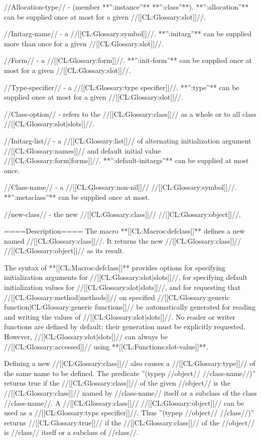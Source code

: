 //Allocation-type// - (member **'':instance''** **'':class''**). **'':allocation''** can be supplied once at most for a given //[[CL:Glossary:slot]]//.

//Initarg-name// - a //[[CL:Glossary:symbol]]//. **'':initarg''** can be supplied more than once for a given //[[CL:Glossary:slot]]//.

//Form// - a //[[CL:Glossary:form]]//. **'':init-form''** can be supplied once at most for a given //[[CL:Glossary:slot]]//.

//Type-specifier// - a //[[CL:Glossary:type specifier]]//. **'':type''** can be supplied once at most for a given //[[CL:Glossary:slot]]//.

//Class-option// - refers to the //[[CL:Glossary:class]]// as a whole or to all class //[[CL:Glossary:slot|slots]]//.

//Initarg-list// - a //[[CL:Glossary:list]]// of alternating initialization argument //[[CL:Glossary:names]]// and default initial value //[[CL:Glossary:form|forms]]//. **'':default-initargs''** can be supplied at most once.

//Class-name// - a //[[CL:Glossary:non-nil]]// //[[CL:Glossary:symbol]]//. **'':metaclass''** can be supplied once at most.

//new-class// - the new //[[CL:Glossary:class]]// //[[CL:Glossary:object]]//.

====Description====
The macro **[[CL:Macros:defclass]]** defines a new named //[[CL:Glossary:class]]//. It returns the new //[[CL:Glossary:class]]// //[[CL:Glossary:object]]// as its result.

The syntax of **[[CL:Macros:defclass]]** provides options for specifying initialization arguments for //[[CL:Glossary:slot|slots]]//, for specifying default initialization values for //[[CL:Glossary:slot|slots]]//, and for requesting that //[[CL:Glossary:method|methods]]// on specified //[[CL:Glossary:generic function|CL:Glossary:generic functions]]// be automatically generated for reading and writing the values of //[[CL:Glossary:slot|slots]]//. No reader or writer functions are defined by default; their generation must be explicitly requested. However, //[[CL:Glossary:slot|slots]]// can always be //[[CL:Glossary:accessed]]// using **[[CL:Functions:slot-value]]**.

Defining a new //[[CL:Glossary:class]]// also causes a //[[CL:Glossary:type]]// of the same name to be defined. The predicate ''(typep //object// //class-name//)'' returns true if the //[[CL:Glossary:class]]// of the given //object// is the //[[CL:Glossary:class]]// named by //class-name// itself or a subclass of the class //class-name//. A //[[CL:Glossary:class]]// //[[CL:Glossary:object]]// can be used as a //[[CL:Glossary:type specifier]]//. Thus ''(typep //object// //class//)'' returns //[[CL:Glossary:true]]// if the //[[CL:Glossary:class]]// of the //object// is //class// itself or a subclass of //class//.

